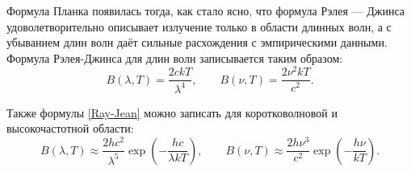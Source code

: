 Формула Планка появилась тогда, как стало ясно, что формула Рэлея — Джинса удоволетворительно описывает излучение только в области длинных волн, а с убыванием длин волн даёт сильные расхождения с эмпирическими данными. Формула Рэлея-Джинса для длин волн записывается таким образом:
\begin{equation}
	B(\lambda, T) = \frac{2 c k T}{\lambda^4}, \quad\quad B(\nu, T) = \frac{2 \nu^2 k T}{c^2}.
\label{Ray-Jean}
\end{equation}

Также формулы \eqref{Ray-Jean} можно записать для коротковолновой и высокочастотной области:
\begin{equation}
B(\lambda,T)\approx\frac{2hc^2}{\lambda^5}\exp\left(-\frac{hc}{\lambda kT}\right), \quad \quad B(\nu,T)\approx\frac{2h\nu^3}{c^2}\exp\left(-\frac{h\nu}{kT}\right).
\end{equation}